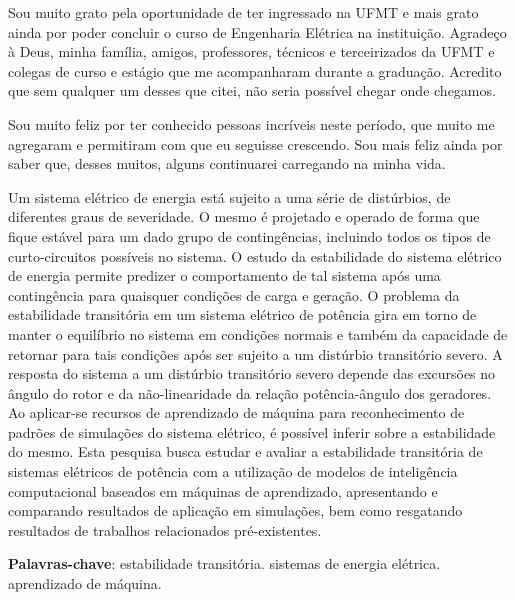 \documentclass[12pt,oneside,a4paper,chapter=TITLE,section=TITLE,sumario=tradicional,english,brazil]{abntex2}
\begin{document}
	\vspace*{1.5cm}
	\vfill
	
\newpage
\begin{agradecimentos}
	Sou muito grato pela oportunidade de ter ingressado na UFMT e mais grato ainda por poder concluir o curso de Engenharia Elétrica na instituição. Agradeço à Deus, minha família, amigos, professores, técnicos  e terceirizados da UFMT e colegas de curso e estágio que me acompanharam durante a graduação. Acredito que sem qualquer um desses que citei, não seria possível chegar onde chegamos.\par
Sou muito feliz por ter conhecido pessoas incríveis neste período, que muito me agregaram e permitiram com que eu seguisse crescendo. Sou mais feliz ainda por saber que, desses muitos, alguns continuarei carregando na minha vida.\par
\end{agradecimentos}

\begin{resumo}
\setlength{\absparsep}{18pt}
	Um sistema elétrico de energia está sujeito a uma série de distúrbios, de diferentes graus de severidade. O mesmo é projetado e operado de forma que fique estável para um dado grupo de contingências, incluindo todos os tipos de curto-circuitos possíveis no sistema. O estudo da estabilidade do sistema elétrico de energia permite predizer o comportamento de tal sistema após uma contingência para quaisquer condições de carga e geração.
O problema da estabilidade transitória em um sistema elétrico de potência gira em torno de manter o equilíbrio no sistema em condições normais e também da capacidade de retornar para tais condições após ser sujeito a um distúrbio transitório severo. A resposta do sistema a um distúrbio transitório severo depende das excursões no ângulo do rotor e da não-linearidade da relação potência-ângulo dos geradores. Ao aplicar-se recursos de aprendizado de máquina para reconhecimento de padrões de simulações do sistema elétrico, é possível inferir sobre a estabilidade do mesmo.
Esta pesquisa busca estudar e avaliar a estabilidade transitória de sistemas elétricos de potência com a utilização de modelos de inteligência computacional baseados em máquinas de aprendizado, apresentando e comparando resultados de aplicação em simulações, bem como resgatando resultados de trabalhos relacionados pré-existentes.

 \textbf{Palavras-chave}: estabilidade transitória. sistemas de energia elétrica. aprendizado de máquina.
\end{resumo}
\end{document}
